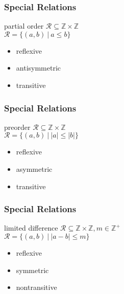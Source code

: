 \documentclass[dvipsnames]{beamer}
\begin{document}
\begin{frame}
  \frametitle{Special Relations}

  \begin{block}{partial order}
    $\mathcal{R} \subseteq \mathbb{Z} \times \mathbb{Z}$\\
    $\mathcal{R} = \{(a,b)~|~ a \leq b\}$

    \medskip
    \begin{itemize}
      \item reflexive
      \item antisymmetric
      \item transitive
    \end{itemize}
  \end{block}
\end{frame}

\begin{frame}
  \frametitle{Special Relations}

  \begin{block}{preorder}
    $\mathcal{R} \subseteq \mathbb{Z} \times \mathbb{Z}$\\
    $\mathcal{R} = \{(a,b)~|~|a| \leq |b|\}$

    \medskip
    \begin{itemize}
      \item reflexive
      \item asymmetric
      \item transitive
    \end{itemize}
  \end{block}
\end{frame}

\begin{frame}
  \frametitle{Special Relations}

  \begin{block}{limited difference}
    $\mathcal{R} \subseteq \mathbb{Z} \times \mathbb{Z}, m \in \mathbb{Z}^+$\\
    $\mathcal{R} = \{(a,b)~|~|a-b| \leq m\}$

    \medskip
    \begin{itemize}
      \item reflexive
      \item symmetric
      \item nontransitive
    \end{itemize}
  \end{block}
\end{frame}
\end{document}
